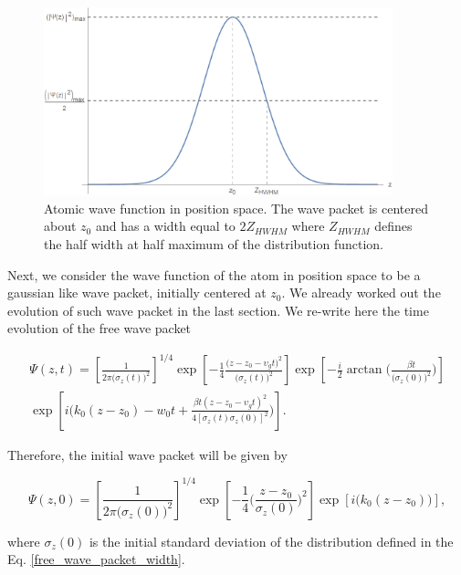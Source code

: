 \documentclass{article}
\begin{document}
\begin{figure}
\centering
\includegraphics[width=0.9\textwidth]{atom_wave_func_pos_space.png}
\caption{Atomic wave function in position space. The wave packet is centered about $z_{0}$ and has a width equal to $2Z_{HWHM}$ where $Z_{HWHM}$ defines the half width at half maximum of the distribution function.}
\label{atom_wave_func_pos_space}
\end{figure}

Next, we consider the wave function of the atom in position space to be a gaussian like wave packet, initially centered at $z_{0}$. We already worked out the evolution of such wave packet in the last section. We re-write here the time evolution of the free wave packet

\begin{multline}\label{atom_wave_function_position_space}
    \Psi (z, t) = \left[\frac{1}{2 \pi \big(\sigma_{z}(t)\big)^2} \right]^{1/4} \exp \left[-\frac{1}{4} \frac{ \big(z - z_{0} - \upsilon_{g} t \big)^{2}}{\big(\sigma_{z}(t)\big)^{2}} \right] \exp \left[-\frac{i}{2} \arctan\Bigg(\frac{\beta t }{\big(\sigma_{z}(0)\big)^{2}}\Bigg) \right] \\ \exp \left[i \bigg(k_{0}(z-z_{0}) - w_{0}t + \frac{ \beta t (z - z_{0} - \upsilon_{g} t)^{2}}{ 4[\sigma_{z}(t)\sigma_{z}(0)]^{2}} \bigg) \right].
\end{multline}

Therefore, the initial wave packet will be given by

\begin{equation}\label{initial_atom_wave_function_position_space}
    \Psi (z, 0) = \left[\frac{1}{2 \pi \big(\sigma_{z}(0)\big)^2} \right]^{1/4} \exp \left[-\frac{1}{4}\bigg(\frac{z-z_{0}}{\sigma_{z}(0)}\bigg)^{2} \right] \exp \left[i \bigg(k_{0}(z-z_{0})\bigg) \right],
\end{equation}

where $\sigma_{z}(0)$ is the initial standard deviation of the distribution defined in the Eq. \ref{free_wave_packet_width}.
\end{document}
